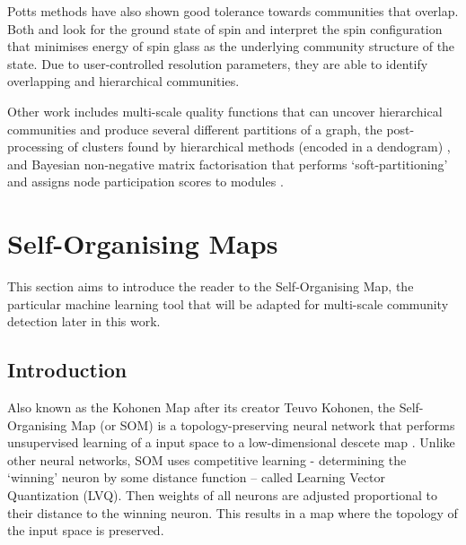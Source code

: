 \documentclass{report}
\begin{document}
Potts methods have also shown good tolerance towards communities that overlap. Both \cite{reichardt2006statistical} and \cite{ronhovde2009multiresolution} look for the ground state of spin and interpret the spin configuration that minimises energy of spin glass as the underlying community structure of the state. Due to user-controlled resolution parameters, they are able to identify overlapping and hierarchical communities.

Other work includes multi-scale quality functions that can uncover hierarchical communities and produce several different partitions of a graph, the post-processing of clusters found by hierarchical methods (encoded in a dendogram) \cite{pons2011post}, and Bayesian non-negative matrix factorisation  that performs `soft-partitioning' and assigns node participation scores to modules \cite{psorakis2011overlapping}.

\section{Self-Organising Maps}
This section aims to introduce the reader to the Self-Organising Map, the particular machine learning tool that will be adapted for multi-scale community detection later in this work.

\subsection{Introduction}
Also known as the Kohonen Map after its creator Teuvo Kohonen, the Self-Organising Map (or SOM) is a topology-preserving neural network that performs unsupervised learning of a input space to a low-dimensional descete map \cite{kohonen1982self,kohonen1990self,kohonen1995learning}. Unlike other neural networks, SOM uses competitive learning - determining the `winning' neuron by some distance function -- called Learning Vector Quantization (LVQ). Then weights of all neurons are adjusted proportional to their distance to the winning neuron. This results in a map where the topology of the input space is preserved.
\end{document}
